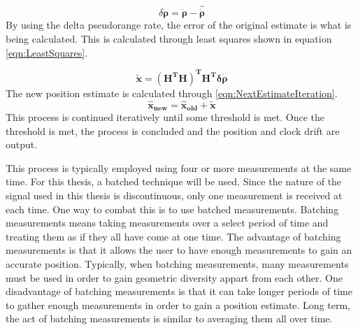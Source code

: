 \documentclass[12pt]{report}
\begin{document}
\begin{equation}
\delta \mathbf{\dot{\rho}} = \mathbf{\dot{\rho}} - \mathbf{\hat{\dot{\rho}}}
\label{eqn:deltarangerate}
\end{equation}
By using the delta pseudorange rate, the error of the original estimate is what is being calculated. This is calculated through least squares shown in equation \ref{eqn:LeastSquares}.

\begin{equation}
\mathbf{\tilde{x}} = \mathbf{(H^TH)^T H^T \delta \dot{\rho}}
    \label{eqn:LeastSquares}
\end{equation}
The new position estimate is calculated through \ref{eqn:NextEstimateIteration}.
\begin{equation}
    \mathbf{\hat{x}_{new}} = \mathbf{\hat{x}_{old}} + \mathbf{\tilde{x}}
\label{eqn:NextEstimateIteration}
\end{equation}
This process is continued iteratively until some threshold is met. Once the threshold is met, the process is concluded and the position and clock drift are output.

This process is typically employed using four or more measurements at the same time. For this thesis, a batched technique will be used. Since the nature of the signal used in this thesis is discontinuous, only one measurement is received at each time. One way to combat this is to use batched measurements. Batching measurements means taking measurements over a select period of time and treating them as if they all have come at one time. The advantage of batching measurements is that it allows the user to have enough measurements to gain an accurate position. Typically, when batching measurements, many measurements must be used in order to gain geometric diversity appart from each other. One disadvantage of batching measurements is that it can take longer periods of time to gather enough measurements in order to gain a position estimate. Long term, the act of batching measurements is similar to averaging them all over time. 
\end{document}

